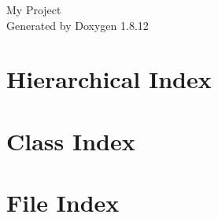 \documentclass[twoside]{book}
\newcommand{\+}{\discretionary{\mbox{\scriptsize$\hookleftarrow$}}{}{}}
\newcommand{\clearemptydoublepage}{%
  \newpage{\pagestyle{empty}\cleardoublepage}%
}
\begin{document}
\hypersetup{pageanchor=false,
             bookmarksnumbered=true,
             pdfencoding=unicode
            }
\begin{titlepage}
\vspace*{7cm}
\begin{center}%
{\Large My Project }\\
\vspace*{1cm}
{\large Generated by Doxygen 1.8.12}\\
\end{center}
\end{titlepage}
\clearemptydoublepage
{}
\tableofcontents
\clearemptydoublepage
{}
\hypersetup{pageanchor=true}

\chapter{Hierarchical Index}

\chapter{Class Index}

\chapter{File Index}

\end{document}
